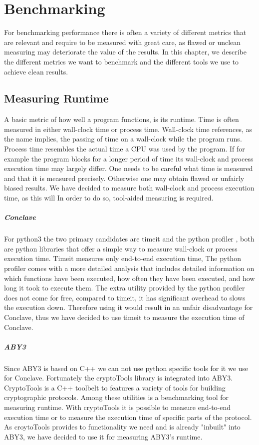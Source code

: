 \chapter{Benchmarking}
For benchmarking performance there is often a variety of different metrics that are relevant and require to be measured with great care, as flawed or unclean measuring may deteriorate the value of the results. In this chapter, we describe the different metrics we want to benchmark and the different tools we use to achieve clean results.

\section{Measuring Runtime}
A basic metric of how well a program functions, is its runtime. Time is often measured in either wall-clock time or process time. Wall-clock time references, as the name implies, the passing of time on a wall-clock while the program runs. 
Process time resembles the actual time a CPU was used by the program. If for example the program blocks for a longer period of time its wall-clock and process execution time may largely differ.   One needs to be careful what time is measured and that it is measured precisely. Otherwise one may obtain flawed or unfairly biased results. We have decided to measure both wall-clock and process execution time, as this will 
In order to do so, tool-aided measuring is required.

\paragraph{Conclave}
 For python3 the two primary candidates are timeit \cite{time} and the python profiler \cite{cProfile},
 both are python libraries that offer a simple way to measure wall-clock or process execution time. Timeit measures only end-to-end execution time,    The python profiler comes with a more detailed analysis that includes detailed information on which functions have been executed, how often they have been executed, and how long it took to execute them. The extra utility provided by the python profiler does not come for free, compared to timeit, it has significant overhead to slows the execution down. Therefore using it would result in an unfair disadvantage for Conclave, thus we have decided to use timeit to measure the execution time of Conclave. 
\paragraph{ABY3}
Since ABY3 is based on C++ we can not use python specific tools for it we use for Conclave. Fortunately the cryptoTools library \cite{cryotoTools} is integrated into ABY3. CryptoTools is a C++ toolbelt to features a variety of tools for building cryptographic protocols. Among these utilities is a benchmarking tool for measuring runtime. With cryptoTools it is possible to measure end-to-end execution time or to measure the execution time of specific parts of the protocol. As croytoTools provides to functionality we need and is already "inbuilt" into ABY3, we have decided to use it for measuring ABY3's runtime.
